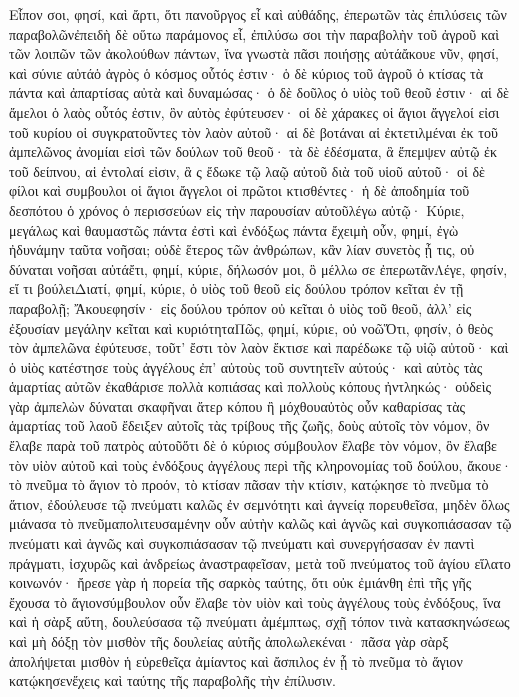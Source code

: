 Εἶπον σοι, φησί, καὶ ἄρτι, ὅτι πανοῦργος εἶ καὶ αὐθάδης, ἐπερωτῶν τὰς ἐπιλύσεις τῶν παραβολῶνἐπειδὴ δὲ οὕτω παράμονος εἶ, ἐπιλύσω σοι τὴν παραβολὴν τοῦ ἀγροῦ καὶ τῶν λοιπῶν τῶν ἀκολούθων πάντων, ἵνα γνωστὰ πᾶσι ποιήσῃς αὐτάἄκουε νῦν, φησί, καὶ σύνιε αὐτάὁ ἀγρὸς ὁ κόσμος οὗτός ἐστιν· ὁ δὲ κύριος τοῦ ἀγροῦ ὁ κτίσας τὰ πάντα καὶ ἀπαρτίσας αὐτὰ καὶ δυναμώσας· ὁ δὲ δοῦλος ὁ υἱὸς τοῦ θεοῦ ἐστιν· αἱ δὲ ἄμελοι ὁ λαὸς οὗτός ἐστιν, ὃν αὐτὸς ἐφύτευσεν· οἱ δὲ χάρακες οἱ ἅγιοι ἄγγελοί εἰσι τοῦ κυρίου οἱ συγκρατοῦντες τὸν λαὸν αὐτοῦ· αἱ δὲ βοτάναι αἱ ἐκτετιλμέναι ἐκ τοῦ ἀμπελῶνος ἀνομίαι εἰσὶ τῶν δούλων τοῦ θεοῦ· τὰ δὲ ἐδέσματα, ἃ ἔπεμψεν αὐτῷ ἐκ τοῦ δείπνου, αἱ ἐντολαί εἰσιν, ἃ ς ἔδωκε τῷ λαῷ αὐτοῦ διὰ τοῦ υἱοῦ αὐτοῦ· οἱ δὲ φίλοι καὶ συμβουλοι οἱ ἅγιοι ἄγγελοι οἱ πρῶτοι κτισθέντες· ἡ δὲ ἀποδημία τοῦ δεσπότου ὁ χρόνος ὁ περισσεύων εἰς τὴν παρουσίαν αὐτοῦλέγω αὐτῷ· Κύριε, μεγάλως καὶ θαυμαστῶς πάντα ἐστὶ καὶ ἐνδόξως πάντα ἔχειμὴ οὖν, φημί, ἐγὼ ἠδυνάμην ταῦτα νοῆσαι; οὐδὲ ἕτερος τῶν ἀνθρώπων, κἂν λίαν συνετὸς ᾖ τις, οὐ δύναται νοῆσαι αὐτάἔτι, φημί, κύριε, δήλωσόν μοι, ὃ μέλλω σε ἐπερωτᾶνΛέγε, φησίν, εἴ τι βούλειΔιατί, φημί, κύριε, ὁ υἱὸς τοῦ θεοῦ εἰς δούλου τρόπον κεῖται ἐν τῇ παραβολῇ;
Ἄκουεφησίν· εἰς δούλου τρόπον οὐ κεῖται ὁ υἱὸς τοῦ θεοῦ, ἀλλ’ εἰς ἐξουσίαν μεγάλην κεῖται καὶ κυριότηταΠῶς, φημί, κύριε, οὐ νοῶὍτι, φησίν, ὁ θεὸς τὸν ἀμπελῶνα ἐφύτευσε, τοῦτ’ ἔστι τὸν λαὸν ἔκτισε καὶ παρέδωκε τῷ υἱῷ αὐτοῦ· καὶ ὁ υἱὸς κατέστησε τοὺς ἀγγέλους ἐπ’ αὐτοὺς τοῦ συντητεῖν αὐτούς· καὶ αὐτὸς τὰς ἁμαρτίας αὐτῶν ἐκαθάρισε πολλὰ κοπιάσας καὶ πολλοὺς κόπους ἠντληκώς· οὐδεὶς γὰρ ἀμπελὼν δύναται σκαφῆναι ἄτερ κόπου ἢ μόχθουαὐτὸς οὖν καθαρίσας τὰς ἁμαρτίας τοῦ λαοῦ ἔδειξεν αὐτοῖς τὰς τρίβους τῆς ζωῆς, δοὺς αὐτοῖς τὸν νόμον, ὃν ἔλαβε παρὰ τοῦ πατρὸς αὐτοῦὅτι δὲ ὁ κύριος σύμβουλον ἔλαβε τὸν νόμον, ὃν ἔλαβε τὸν υἱὸν αὐτοῦ καὶ τοὺς ἐνδόξους ἀγγέλους περὶ τῆς κληρονομίας τοῦ δούλου, ἄκουε· τὸ πνεῦμα τὸ ἅγιον τὸ προόν, τὸ κτίσαν πᾶσαν τὴν κτίσιν, κατῴκησε τὸ πνεῦμα τὸ ἅτιον, ἐδούλευσε τῷ πνεύματι καλῶς ἐν σεμνότητι καὶ ἁγνείᾳ πορευθεῖσα, μηδὲν ὅλως μιάνασα τὸ πνεῦμαπολιτευσαμένην οὖν αὐτὴν καλῶς καὶ ἁγνῶς καὶ συγκοπιάσασαν τῷ πνεύματι καὶ ἁγνῶς καὶ συγκοπιάσασαν τῷ πνεύματι καὶ συνεργήσασαν ἐν παντὶ πράγματι, ἰσχυρῶς καὶ ἀνδρείως ἀναστραφεῖσαν, μετὰ τοῦ πνεύματος τοῦ ἁγίου εἵλατο κοινωνόν· ἤρεσε γὰρ ἡ πορεία τῆς σαρκὸς ταύτης, ὅτι οὐκ ἐμιάνθη ἐπὶ τῆς γῆς ἔχουσα τὸ ἅγιονσύμβουλον οὖν ἔλαβε τὸν υἱὸν καὶ τοὺς ἀγγέλους τοὺς ἐνδόξους, ἵνα καὶ ἡ σὰρξ αὕτη, δουλεύσασα τῷ πνεύματι ἀμέμπτως, σχῇ τόπον τινὰ κατασκηνώσεως καὶ μὴ δόξῃ τὸν μισθὸν τῆς δουλείας αὐτῆς ἀπολωλεκέναι· πᾶσα γὰρ σὰρξ ἀπολήψεται μισθὸν ἡ εὑρεθεῖςα ἀμίαντος καὶ ἄσπιλος ἐν ᾗ τὸ πνεῦμα τὸ ἅγιον κατῴκησενἔχεις καὶ ταύτης τῆς παραβολῆς τὴν ἐπίλυσιν.
